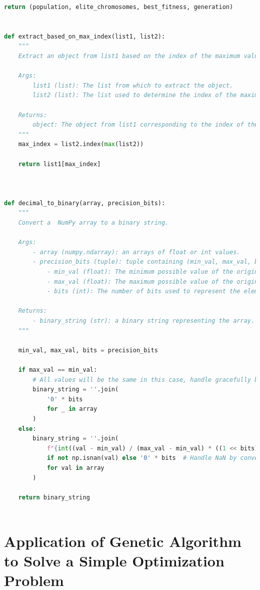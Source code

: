 \documentclass[12pt]{article}
\begin{document}
\begin{lstlisting}[language=Python, caption={Genetic Algorithm}, numbers=none, breaklines=true]
    return (population, elite_chromosomes, best_fitness, generation)
    
 
def extract_based_on_max_index(list1, list2):
    """
    Extract an object from list1 based on the index of the maximum value in list2.

    Args:
        list1 (list): The list from which to extract the object.
        list2 (list): The list used to determine the index of the maximum value.

    Returns:
        object: The object from list1 corresponding to the index of the maximum value in list2.
    """
    max_index = list2.index(max(list2))

    return list1[max_index]
    


def decimal_to_binary(array, precision_bits):
    """
    Convert a  NumPy array to a binary string.

    Args:
        - array (numpy.ndarray): an arrays of float or int values.
        - precision_bits (tuple): tuple containing (min_val, max_val, bits) to define the precision for array.
            - min_val (float): The minimum possible value of the original range for the element.
            - max_val (float): The maximum possible value of the original range for the element.
            - bits (int): The number of bits used to represent the element in the binary string.

    Returns:
        - binary_string (str): a binary string representing the array.
    """

    min_val, max_val, bits = precision_bits

    if max_val == min_val:
        # All values will be the same in this case, handle gracefully by converting to '0' * bits
        binary_string = ''.join(
            '0' * bits
            for _ in array
        )
    else:
        binary_string = ''.join(
            f"{int((val - min_val) / (max_val - min_val) * ((1 << bits) - 1)):0{bits}b}"
            if not np.isnan(val) else '0' * bits  # Handle NaN by converting to '0' * bits
            for val in array
        )

    return binary_string
    
\end{lstlisting}

\newpage


\section{Application of Genetic Algorithm to Solve a Simple Optimization Problem}
\end{document}
